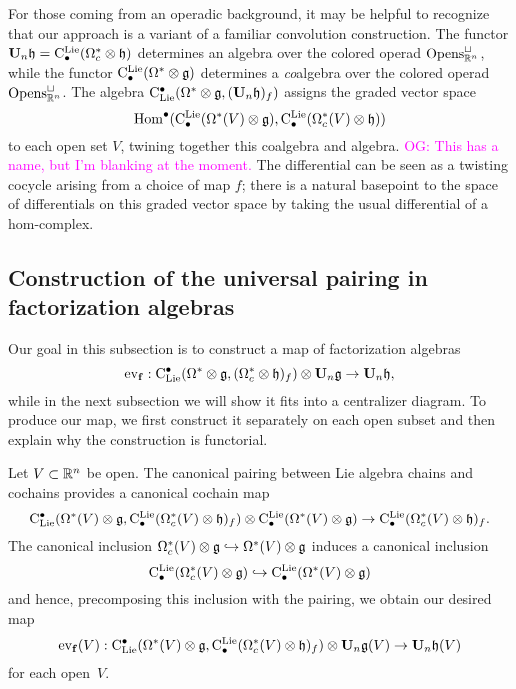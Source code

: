 \documentclass[11pt]{amsart}
\numberwithin{equation}{section}
\def\owen{\textcolor{magenta}{OG: }\textcolor{magenta}}
\begin{document}
\begin{rmk}
For those coming from an operadic background, it may be helpful to recognize that our approach is a variant of a familiar convolution construction.
The functor $\mathbf U_n \mathfrak h = {\rm C}^{\rm Lie}_\bullet(\Omega^*_c \otimes \mathfrak h)$ determines an algebra over the colored operad ${\rm Opens}_{\mathbb R^n}^\sqcup$,
while the functor ${\rm C}^{\rm Lie}_\bullet(\Omega^* \otimes \mathfrak g)$ determines a {\em co}\/algebra over the colored operad ${\rm Opens}_{\mathbb R^n}^\sqcup$.
The algebra ${\rm C}_{\rm Lie}^\bullet(\Omega^* \otimes \mathfrak g, (\mathbf U_n \mathfrak h)_f)$ assigns the graded vector space
\[
{\rm Hom}^\bullet({\rm C}^{\rm Lie}_\bullet(\Omega^*(V) \otimes \mathfrak g), {\rm C}^{\rm Lie}_\bullet(\Omega^*_c(V) \otimes \mathfrak h))
\] 
to each open set $V$,
twining together this coalgebra and algebra.
\owen{This has a name, but I'm blanking at the moment.}
The differential can be seen as a twisting cocycle arising from a choice of map $f$;
there is a natural basepoint to the space of differentials on this graded vector space by taking the usual differential of a hom-complex.
\end{rmk}

%
%
%
%

\subsection{Construction of the universal pairing in factorization algebras}
\label{SS:constuctionthetaf}

Our goal in this subsection is to construct a map of factorization algebras
\[
{\rm ev}_{{\bf f}}: {\rm C}_{\rm Lie}^\bullet(\Omega^* \otimes \mathfrak g, (\Omega^*_c \otimes \mathfrak h)_f) \otimes \mathbf U_n \mathfrak g \to \mathbf U_n \mathfrak h,
\]
while in the next subsection we will show it fits into a centralizer diagram.
To produce our map, we first construct it separately on each open subset and then explain why the construction is functorial. 

Let $V \subset \mathbb R^n$ be open.
The canonical pairing between Lie algebra chains and cochains provides a canonical cochain map
\[
{\rm C}_{\rm Lie}^\bullet(\Omega^*(V) \otimes \mathfrak g, {\rm C}^{\rm Lie}_\bullet(\Omega^*_c(V) \otimes \mathfrak h)_f) \otimes {\rm C}^{\rm Lie}_\bullet(\Omega^*(V) \otimes \mathfrak g) \to {\rm C}^{\rm Lie}_\bullet(\Omega^*_c(V) \otimes \mathfrak h)_f.
\]
The canonical inclusion $\Omega^*_c(V) \otimes \mathfrak g \hookrightarrow \Omega^*(V) \otimes \mathfrak g$ induces a canonical inclusion 
\[
{\rm C}^{\rm Lie}_\bullet(\Omega^*_c(V) \otimes \mathfrak g) \hookrightarrow {\rm C}^{\rm Lie}_\bullet(\Omega^*(V) \otimes \mathfrak g)
\]
and hence, precomposing this inclusion with the pairing, we obtain our desired map
\[
{\rm ev}_{{\bf f}}(V): {\rm C}_{\rm Lie}^\bullet(\Omega^*(V) \otimes \mathfrak g, {\rm C}^{\rm Lie}_\bullet(\Omega^*_c(V) \otimes \mathfrak h)_f) \otimes \mathbf U_n \mathfrak g(V) \to \mathbf U_n \mathfrak h(V)
\]
for each open~$V$.
\end{document}
